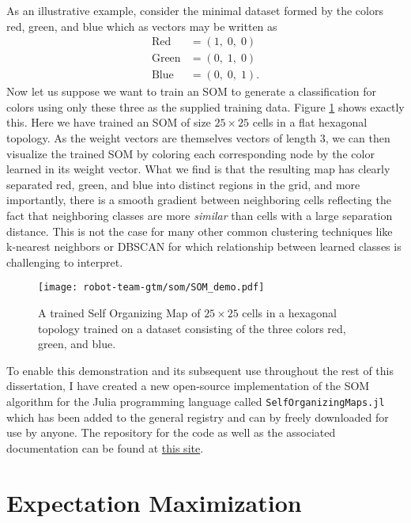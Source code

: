As an illustrative example, consider the minimal dataset formed by the colors red, green, and blue which as vectors may be written as
\begin{align}
  \text{Red} &= \left(1,\; 0,\; 0 \right)\\
  \text{Green} &= \left(0,\; 1,\; 0 \right) \\
  \text{Blue} &= \left(0,\; 0,\; 1 \right).
\end{align}
Now let us suppose we want to train an SOM to generate a classification for colors using only these three as the supplied training data. Figure \ref{fig:som-demo} shows exactly this. Here we have trained an SOM of size $25 \times 25$ cells in a flat hexagonal topology. As the weight vectors are themselves vectors of length $3$, we can then visualize the trained SOM by coloring each corresponding node by the color learned in its weight vector. What we find is that the resulting map has clearly separated red, green, and blue into distinct regions in the grid, and more importantly, there is a smooth gradient between neighboring cells reflecting the fact that neighboring classes are more \textit{similar} than cells with a large separation distance. This is not the case for many other common clustering techniques like k-nearest neighbors or DBSCAN for which relationship between learned classes is challenging to interpret.

\begin{figure}[h!]
  \centering
  \texttt{[image: robot-team-gtm/som/SOM\_demo.pdf]}
  \caption{A trained Self Organizing Map of $25\times 25$ cells in a hexagonal topology trained on a dataset consisting of the three colors red, green, and blue.}
  \label{fig:som-demo}
\end{figure}

To enable this demonstration and its subsequent use throughout the rest of this dissertation, I have created a new open-source implementation of the SOM algorithm for the Julia programming language called \texttt{SelfOrganizingMaps.jl} which has been added to the general registry and can by freely downloaded for use by anyone. The repository for the code as well as the associated documentation can be found at \href{https://github.com/john-waczak/SelfOrganizingMaps.jl}{this site}.



\section{Expectation Maximization}

